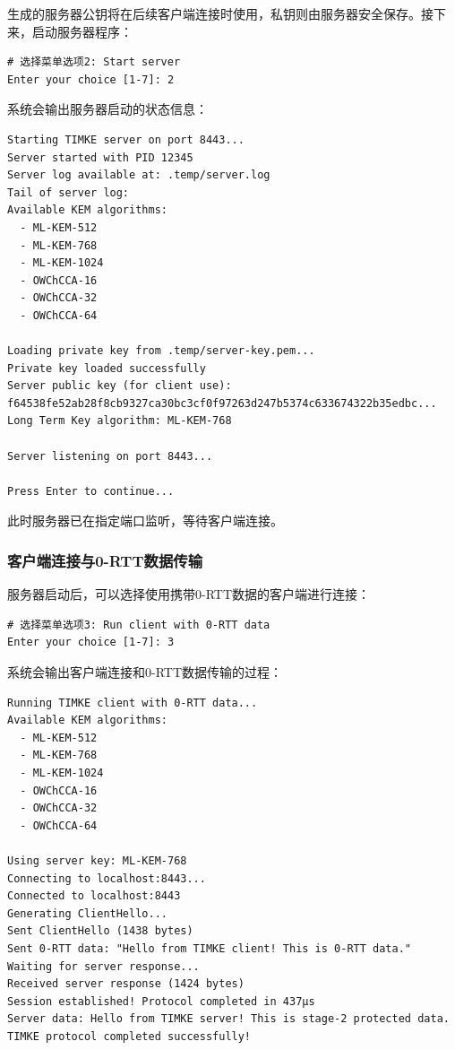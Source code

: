 生成的服务器公钥将在后续客户端连接时使用，私钥则由服务器安全保存。接下来，启动服务器程序：

\begin{verbatim}
# 选择菜单选项2: Start server
Enter your choice [1-7]: 2
\end{verbatim}

系统会输出服务器启动的状态信息：

\begin{verbatim}
Starting TIMKE server on port 8443...
Server started with PID 12345
Server log available at: .temp/server.log
Tail of server log:
Available KEM algorithms:
  - ML-KEM-512
  - ML-KEM-768
  - ML-KEM-1024
  - OWChCCA-16
  - OWChCCA-32
  - OWChCCA-64

Loading private key from .temp/server-key.pem...
Private key loaded successfully
Server public key (for client use): f64538fe52ab28f8cb9327ca30bc3cf0f97263d247b5374c633674322b35edbc...
Long Term Key algorithm: ML-KEM-768

Server listening on port 8443...

Press Enter to continue...
\end{verbatim}

此时服务器已在指定端口监听，等待客户端连接。

\subsubsection{客户端连接与0-RTT数据传输}

服务器启动后，可以选择使用携带0-RTT数据的客户端进行连接：

\begin{verbatim}
# 选择菜单选项3: Run client with 0-RTT data
Enter your choice [1-7]: 3
\end{verbatim}

系统会输出客户端连接和0-RTT数据传输的过程：

\begin{verbatim}
Running TIMKE client with 0-RTT data...
Available KEM algorithms:
  - ML-KEM-512
  - ML-KEM-768
  - ML-KEM-1024
  - OWChCCA-16
  - OWChCCA-32
  - OWChCCA-64

Using server key: ML-KEM-768
Connecting to localhost:8443...
Connected to localhost:8443
Generating ClientHello...
Sent ClientHello (1438 bytes)
Sent 0-RTT data: "Hello from TIMKE client! This is 0-RTT data."
Waiting for server response...
Received server response (1424 bytes)
Session established! Protocol completed in 437µs
Server data: Hello from TIMKE server! This is stage-2 protected data.
TIMKE protocol completed successfully!

\end{verbatim}

